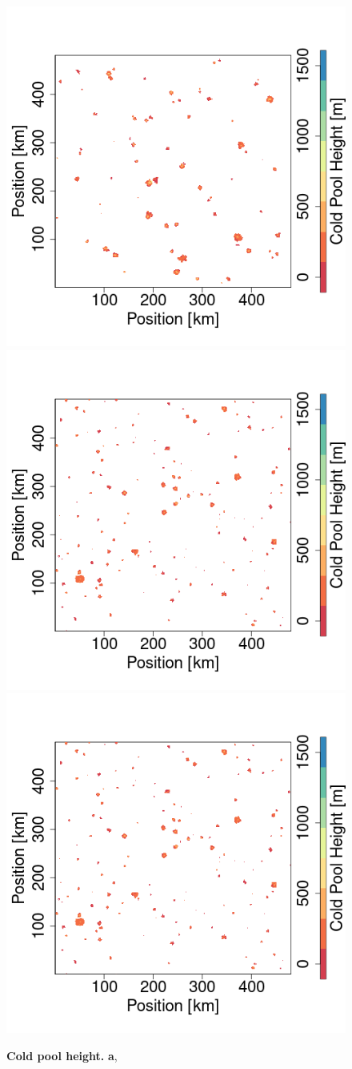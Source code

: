 \documentclass[draft,linenumbers]{agujournal2019}
\begin{document}
\begin{figure}[ht]
\includegraphics[trim={2.5cm 0 2.6cm 0},clip,height=.3\linewidth]{T0_300K_ampl_4_1km_865-1172sequence_CPheight_061.png}
\includegraphics[trim={2.5cm 0 2.6cm 0},clip,height=.3\linewidth]{T0_300K_ampl_4_1km_865-1172sequence_CPheight_103.png}
\includegraphics[trim={2.5cm 0 0 0},clip,height=.3\linewidth]{T0_300K_ampl_4_1km_865-1172sequence_CPheight_103.png}
\vspace{0cm}
\caption{{\bf Cold pool height.}
{\bf a}, 
}
\label{fig:CP_height_distribution}
\end{figure}
\end{document}

